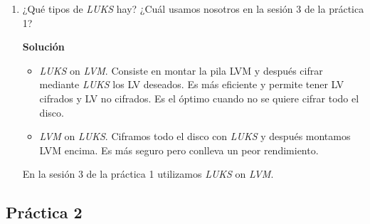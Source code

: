 \documentclass[12pt,spanish]{article}
\newenvironment{solution}{
	\par
	\textbf{Solución}
	\par
	\begin{center}
}
{
	\end{center}
}
\begin{document}
\begin{enumerate}
\begin{itemize}
		\item \textit{cp -a /var/. /newvar}
	\end{itemize}
	?
	\begin{solution}
		\begin{itemize}
			\item \textit{cp -a /var /newvar} copia la carpeta, no el contenido. Es decir, quedaría \textit{/newvar/var/archivos}
			\item \textit{cp -a /var/* /newvar} no copia los archivos ocultos.
			\item \textit{cp -a /var/. /newvar} copia todos los archivos (visibles y ocultos).
		\end{itemize}
	\end{solution}
	\item ¿Qué tipos de \textit{LUKS} hay? ¿Cuál usamos nosotros en la sesión 3 de la práctica 1?
	\begin{solution}
		\begin{itemize}
			\item \textit{LUKS} on \textit{LVM}. Consiste en montar la pila LVM y después cifrar mediante \textit{LUKS} los LV deseados. Es más eficiente y permite tener LV cifrados y LV no cifrados. Es el óptimo cuando no se quiere cifrar todo el disco.
			\item \textit{LVM} on \textit{LUKS}. Ciframos todo el disco con \textit{LUKS} y después montamos LVM encima. Es más seguro pero conlleva un peor rendimiento.
		\end{itemize}
		En la sesión 3 de la práctica 1 utilizamos \textit{LUKS} on \textit{LVM}.
	\end{solution}
\end{enumerate}

\newpage

\subsection{Práctica 2}
\end{document}

